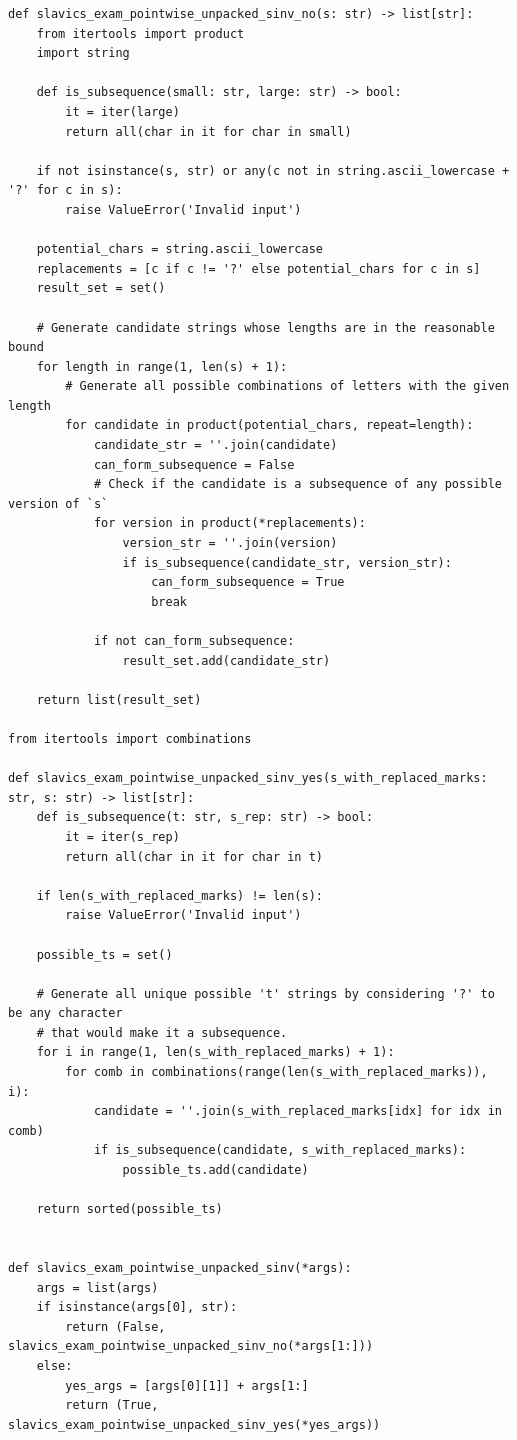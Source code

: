 \documentclass[acmsmall,screen,nonacm]{acmart}
\begin{document}
{\scriptsize
\begin{tcolorbox}[mybox,breakable,title={Composed SINV solution}]
\begin{verbatim}
def slavics_exam_pointwise_unpacked_sinv_no(s: str) -> list[str]:
    from itertools import product
    import string
    
    def is_subsequence(small: str, large: str) -> bool:
        it = iter(large)
        return all(char in it for char in small)

    if not isinstance(s, str) or any(c not in string.ascii_lowercase + '?' for c in s):
        raise ValueError('Invalid input')
    
    potential_chars = string.ascii_lowercase
    replacements = [c if c != '?' else potential_chars for c in s]
    result_set = set()
    
    # Generate candidate strings whose lengths are in the reasonable bound
    for length in range(1, len(s) + 1):
        # Generate all possible combinations of letters with the given length
        for candidate in product(potential_chars, repeat=length):
            candidate_str = ''.join(candidate)
            can_form_subsequence = False
            # Check if the candidate is a subsequence of any possible version of `s`
            for version in product(*replacements):
                version_str = ''.join(version)
                if is_subsequence(candidate_str, version_str):
                    can_form_subsequence = True
                    break
            
            if not can_form_subsequence:
                result_set.add(candidate_str)
    
    return list(result_set)

from itertools import combinations

def slavics_exam_pointwise_unpacked_sinv_yes(s_with_replaced_marks: str, s: str) -> list[str]:
    def is_subsequence(t: str, s_rep: str) -> bool:
        it = iter(s_rep)
        return all(char in it for char in t)

    if len(s_with_replaced_marks) != len(s):
        raise ValueError('Invalid input')
    
    possible_ts = set()

    # Generate all unique possible 't' strings by considering '?' to be any character
    # that would make it a subsequence.
    for i in range(1, len(s_with_replaced_marks) + 1):
        for comb in combinations(range(len(s_with_replaced_marks)), i):
            candidate = ''.join(s_with_replaced_marks[idx] for idx in comb)
            if is_subsequence(candidate, s_with_replaced_marks):
                possible_ts.add(candidate)
    
    return sorted(possible_ts)


def slavics_exam_pointwise_unpacked_sinv(*args):
    args = list(args)
    if isinstance(args[0], str):
        return (False, slavics_exam_pointwise_unpacked_sinv_no(*args[1:]))
    else:
        yes_args = [args[0][1]] + args[1:]
        return (True, slavics_exam_pointwise_unpacked_sinv_yes(*yes_args))
\end{verbatim}
\end{tcolorbox}
}
\end{document}
